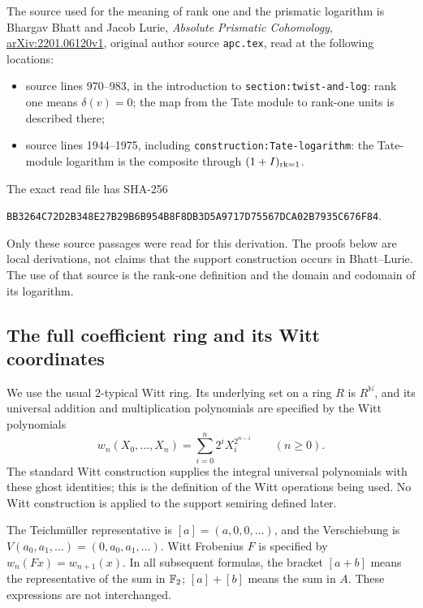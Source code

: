 The source used for the meaning of rank one and the prismatic logarithm is
Bhargav Bhatt and Jacob Lurie, \emph{Absolute Prismatic Cohomology},
\href{https://arxiv.org/abs/2201.06120v1}{arXiv:2201.06120v1}, original
author source \nolinkurl{apc.tex}, read at the following locations:
\begin{itemize}
\item source lines 970--983, in the introduction to
\texttt{section:twist-and-log}: rank one means $\delta(v)=0$;
the map from the Tate module to rank-one units is described there;
\item source lines 1944--1975, including
\texttt{construction:Tate-logarithm}: the Tate-module logarithm is the
composite through $(1+I)_{\mathrm{rk}=1}$.
\end{itemize}
The exact read file has SHA-256
\begin{center}\small\ttfamily
\nolinkurl{BB3264C72D2B348E27B29B6B954B8F8DB3D5A9717D75567DCA02B7935C676F84}.
\end{center}
Only these source passages were read for this derivation. The proofs below
are local derivations, not claims that the support construction occurs in
Bhatt--Lurie. The use of that source is the rank-one definition and the
domain and codomain of its logarithm.

\subsection{The full coefficient ring and its Witt coordinates}
We use the usual $2$-typical Witt ring. Its underlying set on a ring $R$ is
$R^{\mathbb N}$, and its universal addition and multiplication polynomials
are specified by the Witt polynomials
\begin{equation}\label{BLR-eq:witt-polynomials}
 w_n(X_0,\ldots,X_n)=\sum_{i=0}^{n}2^iX_i^{2^{n-i}}
 \qquad(n\geq 0).
\end{equation}
The standard Witt construction supplies the integral universal
polynomials with these ghost identities; this is the definition of the
Witt operations being used. No Witt construction is applied to the
support semiring defined later.

The Teichm\"uller representative is
$[a]=(a,0,0,\ldots)$, and the Verschiebung is
$V(a_0,a_1,\ldots)=(0,a_0,a_1,\ldots)$. Witt Frobenius $F$ is specified by
$w_n(Fx)=w_{n+1}(x)$. In all subsequent formulas,
the bracket $[a+b]$ means the representative of the sum in $\mathbb F_2$;
$[a]+[b]$ means the sum in $A$. These expressions are not interchanged.

